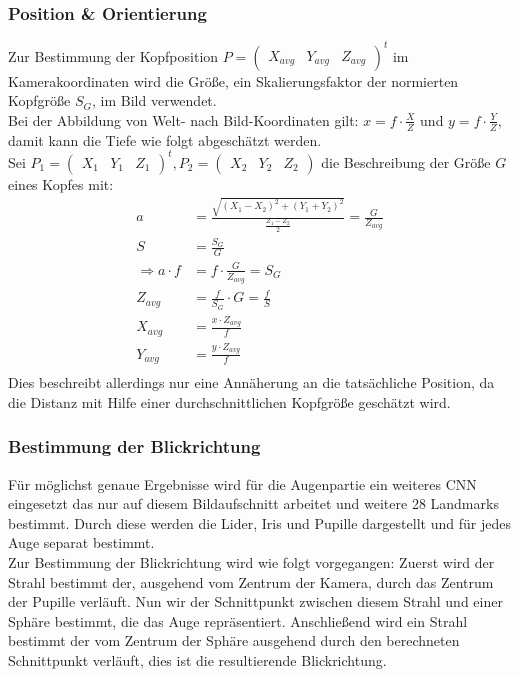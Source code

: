 \subsubsection{Position \& Orientierung}
\label{OpenFace_Pos_Ori}
Zur Bestimmung der Kopfposition $P= \begin{pmatrix}
X_{avg} & Y_{avg} & Z_{avg}
\end{pmatrix}^t$ im Kamerakoordinaten wird die Größe, ein Skalierungsfaktor der normierten Kopfgröße $S_G$, im Bild verwendet.\\
Bei der Abbildung von Welt- nach Bild-Koordinaten gilt: $x=f\cdot \frac{X}{Z}$ und $ y=f\cdot \frac{Y}{Z}$, damit kann die Tiefe wie folgt abgeschätzt werden.\\
Sei $P_1 = \begin{pmatrix}
X_1&Y_1&Z_1
\end{pmatrix}^t, P_2= \begin{pmatrix}
X_2&Y_2&Z_2
\end{pmatrix}$ die Beschreibung der Größe $G$ eines Kopfes mit:\\
\begin{align*}
a &= \frac{\sqrt{(X_1-X_2)^2+(Y_1+Y_2)^2}}{\frac{Z_1-Z_2}{2}} =\frac{G}{Z_{avg}}\\
S &= \frac{S_G}{G}\\
\Rightarrow a\cdot f &= f\cdot\frac{G}{Z_{avg}} = S_G\\
Z_{avg} &= \frac{f}{S_G}\cdot G = \frac{f}{S}\\
X_{avg} &= \frac{x \cdot Z_{avg}}{f}\\
Y_{avg} &= \frac{y \cdot Z_{avg}}{f}\\
\end{align*}
Dies beschreibt allerdings nur eine Annäherung an die tatsächliche Position, da die Distanz mit Hilfe einer durchschnittlichen Kopfgröße geschätzt wird.\\
\cite{OpenFace}
\subsubsection{Bestimmung der Blickrichtung}
\label{OpenFace_Blickrichtung}
Für möglichst genaue Ergebnisse wird für die Augenpartie ein weiteres CNN eingesetzt das nur auf diesem Bildaufschnitt arbeitet und weitere 28 Landmarks bestimmt. Durch diese werden die Lider, Iris und Pupille dargestellt und für jedes Auge separat bestimmt.\\
Zur Bestimmung der Blickrichtung wird wie folgt vorgegangen: Zuerst wird der Strahl bestimmt der, ausgehend vom Zentrum der Kamera, durch das Zentrum der Pupille verläuft. Nun wir der Schnittpunkt zwischen diesem Strahl und einer Sphäre bestimmt, die das Auge repräsentiert. Anschließend wird ein Strahl bestimmt der vom Zentrum der Sphäre ausgehend durch den berechneten Schnittpunkt verläuft, dies ist die resultierende Blickrichtung.

